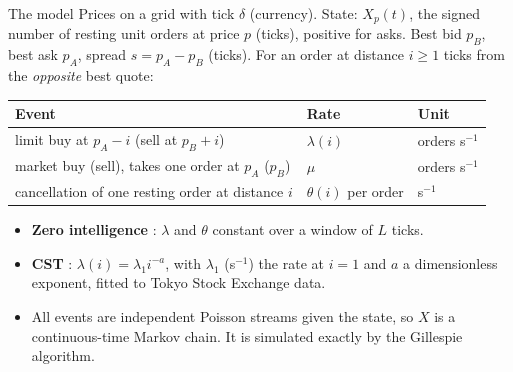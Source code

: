 \documentclass[aspectratio=169,10pt]{beamer}
\begin{document}
\begin{frame}{The model}
  \small
  Prices on a grid with tick $\delta$ (currency). State: $X_p(t)$, the signed number of resting unit orders at price $p$ (ticks), positive for asks. Best bid $p_B$, best ask $p_A$, spread $s = p_A - p_B$ (ticks). For an order at distance $i \geq 1$ ticks from the \emph{opposite} best quote:
  \vspace{0.3em}

  \centering
  \begin{tabular}{lll}
    \toprule
    Event & Rate & Unit \\
    \midrule
    limit buy at $p_A - i$ (sell at $p_B + i$) & $\lambda(i)$ & orders s$^{-1}$ \\
    market buy (sell), takes one order at $p_A$ ($p_B$) & $\mu$ & orders s$^{-1}$ \\
    cancellation of one resting order at distance $i$ & $\theta(i)$ per order & s$^{-1}$ \\
    \bottomrule
  \end{tabular}
  \vspace{0.4em}

  \raggedright
  \begin{itemize}
    \item \textbf{Zero intelligence} \citep{smith2003statistical}: $\lambda$ and $\theta$ constant over a window of $L$ ticks.
    \item \textbf{CST} \citep{cont2010stochastic}: $\lambda(i) = \lambda_1 i^{-a}$, with $\lambda_1$ (s$^{-1}$) the rate at $i = 1$ and $a$ a dimensionless exponent, fitted to Tokyo Stock Exchange data.
    \item All events are independent Poisson streams given the state, so $X$ is a continuous-time Markov chain. It is simulated exactly by the Gillespie algorithm.
  \end{itemize}
\end{frame}
\end{document}
